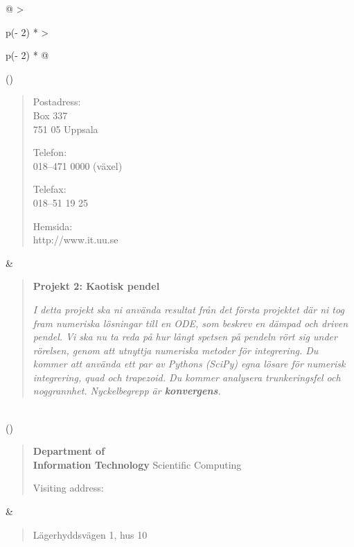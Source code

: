 \documentclass[
]{article}
\begin{document}
\begin{longtable}[]{@{}
  >{\raggedright\arraybackslash}p{(\columnwidth - 2\tabcolsep) * }
  >{\raggedright\arraybackslash}p{(\columnwidth - 2\tabcolsep) * }@{}}
\toprule()
\begin{minipage}[b]{\linewidth}\raggedright
\begin{quote}
Postadress:\\
Box 337\\
751 05 Uppsala

Telefon:\\
018--471 0000 (växel)

Telefax:\\
018--51 19 25

Hemsida:\\
http://www.it.uu.se
\end{quote}\strut
\end{minipage} & \begin{minipage}[b]{\linewidth}\raggedright
\begin{quote}
\textbf{Projekt 2: Kaotisk pendel}

\emph{I detta projekt ska ni använda resultat från det första projektet
där ni tog fram numeriska lösningar till en ODE, som beskrev en dämpad
och driven pendel. Vi ska nu ta reda på hur långt spetsen på pendeln
rört sig under rörelsen, genom att utnyttja numeriska metoder för
integrering. Du kommer att använda ett par av Pythons (SciPy) egna
lösare för numerisk integrering, quad och trapezoid. Du kommer analysera
trunkeringsfel och noggrannhet. Nyckelbegrepp är \textbf{konvergens}.}
\end{quote}
\end{minipage} \\
\midrule()
\endhead
\begin{minipage}[t]{\linewidth}\raggedright
\begin{quote}
\textbf{Department of}\\
\textbf{Information Technology} Scientific Computing

Visiting address:
\end{quote}\strut
\end{minipage} &
 \\
\begin{minipage}[t]{\linewidth}\raggedright
\begin{quote}
Lägerhyddsvägen 1, hus 10


\end{quote}
\end{minipage}
\end{longtable}
\end{document}
